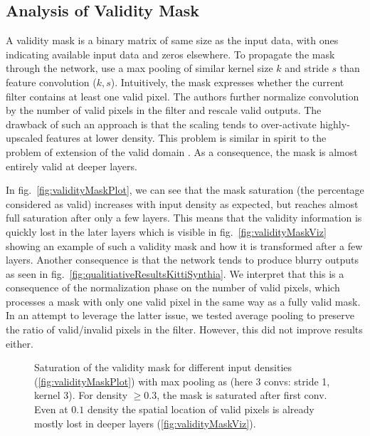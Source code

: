 \documentclass[10pt,twocolumn,letterpaper]{article}
\begin{document}
\subsection{Analysis of Validity Mask}
\label{sec:validity-mask}

A validity mask \cite{uhrig2017sparsity,luo2016understanding} is a binary matrix of same size as the input data, with ones indicating available input data and zeros elsewhere.
To propagate the mask through the network, \cite{uhrig2017sparsity} use a max pooling of similar kernel size $k$ and stride $s$ than feature convolution ($k, s$). Intuitively, the mask expresses whether the current filter contains at least one valid pixel. The authors further normalize convolution by the number of valid pixels in the filter and rescale valid outputs. 
The drawback of such an approach is that the scaling tends to over-activate highly-upscaled features at lower density.
This problem is similar in spirit to the problem of extension of the valid domain \cite{graham2017submanifold}.
As a consequence, the mask is almost entirely valid at deeper layers.

In fig.~\ref{fig:validityMaskPlot}, we can see
that the mask saturation (the percentage considered as valid) increases with input density as expected, but reaches almost full saturation after only a few layers.
This means that the validity information is quickly lost in the later layers which is visible in fig.~\ref{fig:validityMaskViz} showing an example of such a validity mask and how it is transformed after a few layers.
Another consequence is that the network tends to produce
blurry outputs as seen in fig.~\ref{fig:qualitiativeResultsKittiSynthia}. We interpret that this is a consequence of the normalization phase on the number of valid pixels, which
processes a mask with only one valid pixel in the same way as a fully valid mask. In an attempt to leverage the latter issue, we tested average pooling to preserve the ratio of
valid/invalid pixels in the filter. However, this did not improve results either.

\begin{figure}
	\centering
	\hspace{.01\linewidth}
	\caption{Saturation of the validity mask for different input densities (\ref{fig:validityMaskPlot}) with max pooling as \cite{uhrig2017sparsity} (here 3 convs: stride 1, kernel 3). For density $\geq{}0.3$, the mask is saturated after first conv. Even at $0.1$ density the spatial location of valid pixels is already mostly lost in deeper layers (\ref{fig:validityMaskViz}).}
	\label{fig:validityMask}
\end{figure}
\end{document}
